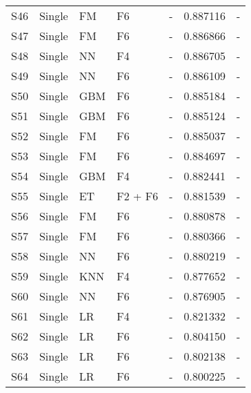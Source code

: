 \begin{table*}[t]
\begin{center}
\begin{minipage}{\textwidth}
{\begin{tabular}{lllllll}
S46 	& Single	& FM		& F6					& - 						& 0.887116	& - \\
S47	& Single	& FM		& F6					& - 						& 0.886866	& - \\
S48	& Single	& NN		& F4					& - 						& 0.886705	& - \\
S49	& Single	& NN		& F6					& - 						& 0.886109	& - \\
S50 	& Single	& GBM		& F6					& - 						& 0.885184	& - \\
S51 	& Single	& GBM		& F6					& - 						& 0.885124	& - \\
S52 	& Single	& FM		& F6					& - 						& 0.885037	& - \\
S53	& Single	& FM		& F6					& - 						& 0.884697	& - \\
S54 	& Single	& GBM		& F4					& - 						& 0.882441	& - \\
S55	& Single	& ET			& F2 + F6				& - 						& 0.881539	& - \\
S56	& Single	& FM		& F6					& - 						& 0.880878	& - \\
S57	& Single	& FM		& F6					& - 						& 0.880366	& - \\
S58	& Single	& NN		& F6					& - 						& 0.880219	& - \\
S59	& Single	& KNN		& F4					& - 						& 0.877652	& - \\
S60	& Single	& NN		& F6					& - 						& 0.876905	& - \\
S61	& Single	& LR			& F4					& - 						& 0.821332	& - \\
S62	& Single	& LR			& F6					& - 						& 0.804150	& - \\
S63	& Single	& LR			& F6					& - 						& 0.802138	& - \\
S64	& Single	& LR			& F6					& - 						& 0.800225	& - \\
\end{tabular}
    }
    \hfill{}
    \label{tb:singleModels}
    \end{minipage}
\end{center}
\end{table*}

